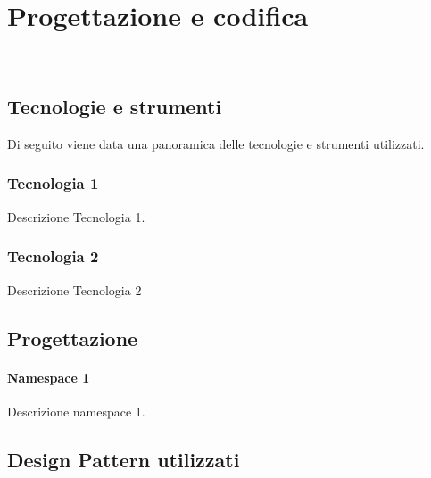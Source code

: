 
\chapter{Progettazione e codifica}
\label{cap:progettazione-codifica}

\\

\section{Tecnologie e strumenti}
\label{sec:tecnologie-strumenti}

Di seguito viene data una panoramica delle tecnologie e strumenti utilizzati.

\subsection*{Tecnologia 1}
Descrizione Tecnologia 1.

\subsection*{Tecnologia 2}
Descrizione Tecnologia 2

\section{Progettazione}
\label{sec:progettazione}

\subsubsection{Namespace 1} %
Descrizione namespace 1.

\begin{namespacedesc}
\end{namespacedesc}


\section{Design Pattern utilizzati}

